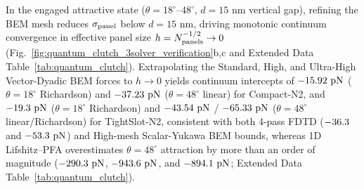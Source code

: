 \documentclass[pdflatex,sn-nature]{sn-jnl}
\DeclareRobustCommand{\roundone}[1]{\fpeval{round(#1,1)}}
\DeclareRobustCommand{\roundtwo}[1]{\fpeval{round(#1,2)}}
\begin{document}
In the engaged attractive state ($\theta=18^\circ\text{--}48^\circ$, $d=15\text{ nm}$ vertical gap), refining the BEM mesh reduces $\sigma_{\rm panel}$ below $d=15\text{ nm}$, driving monotonic continuum convergence in effective panel size $h = N_{\rm panels}^{-1/2} \to 0$ (Fig.~\ref{fig:quantum_clutch_3solver_verification}b,c and Extended Data Table~\ref{tab:quantum_clutch}). Extrapolating the Standard, High, and Ultra-High Vector-Dyadic BEM forces to $h \to 0$ yields continuum intercepts of $\roundtwo{\RotCeightCompactNtwoBemThetaoneeightRichardsonFZPn}\text{ pN}$ ($\theta=18^\circ$ Richardson) and $\roundtwo{\RotCeightCompactNtwoBemThetafoureightContinuumFZPn}\text{ pN}$ ($\theta=48^\circ$ linear) for Compact-N2, and $\roundtwo{\RotCfourTightslotNtwoBemThetaoneeightRichardsonFZPn}\text{ pN}$ ($\theta=18^\circ$ Richardson) and $\roundtwo{\RotCfourTightslotNtwoBemThetafoureightContinuumFZPn}\text{ pN}$ / $\roundtwo{\RotCfourTightslotNtwoBemThetafoureightRichardsonFZPn}\text{ pN}$ ($\theta=48^\circ$ linear/Richardson) for TightSlot-N2, consistent with both 4-pass FDTD ($\roundtwo{\RotCeightCompactNtwoMeepThetafoureightFZPn}$ and $\roundtwo{\RotCfourTightslotNtwoMeepThetafoureightFZPn}\text{ pN}$) and High-mesh Scalar-Yukawa BEM bounds, whereas 1D Lifshitz--PFA overestimates $\theta=48^\circ$ attraction by more than an order of magnitude ($\roundone{\RotCeightCompactNtwoHighThetaZerofoureightpzeroLifshitzPfaFZPn}\text{ pN}$, $\roundone{\RotCfourTightslotNtwoHighThetaZerofoureightpzeroLifshitzPfaFZPn}\text{ pN}$, and $\roundone{\RotConezeroFractalNthreeHighThetaZerofoureightpzeroLifshitzPfaFZPn}\text{ pN}$; Extended Data Table~\ref{tab:quantum_clutch}).
\end{document}
